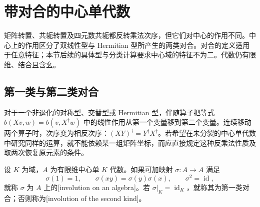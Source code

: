 
%
%

\section{带对合的中心单代数}
\label{b2:sec:B03}

矩阵转置、共轭转置及四元数共轭都反转乘法次序，但它们对中心的作用不同。中心上的作用区分了双线性型与 Hermitian 型所产生的两类对合。对合的定义适用于任意特征；本节后续的具体型与分类计算要求中心域的特征不为二。代数仍有限维、结合且含幺。

\subsection{第一类与第二类对合}
\label{b2:subsec:B03:01}

对于一个非退化的对称型、交替型或 Hermitian 型，伴随算子把等式 \(b(Xv,w)=b(v,X^\dagger w)\) 中的线性作用从第一个变量移到第二个变量。连续移动两个算子时，次序变为相反次序：\((XY)^\dagger=Y^\dagger X^\dagger\)。若希望在未分裂的中心单代数中研究同样的运算，就不能依赖某一组矩阵坐标，而应直接规定这种反乘法性质及取两次恢复原元素的条件。

\begin{definition}\label{b2:def:B-algebra-involution}
	设 \(K\) 为域，\(A\) 为有限维中心单 \(K\) 代数。如果可加映射 \(\sigma:A\to A\) 满足
	\[
		\sigma(1)=1,\qquad \sigma(xy)=\sigma(y)\sigma(x),\qquad \sigma^2=\operatorname{id},
	\]
	就称 \(\sigma\) 为 \(A\) 上的[involution on an algebra]。若 \(\sigma|_K=\operatorname{id}_K\)，就称其为第一类对合；否则称为[involution of the second kind]。
\end{definition}

